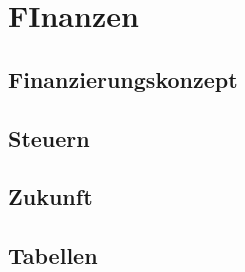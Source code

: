 \chapter{FInanzen}
\label{chap:finanzen}

\section{Finanzierungskonzept}
\section{Steuern}
\section{Zukunft}
\section{Tabellen}